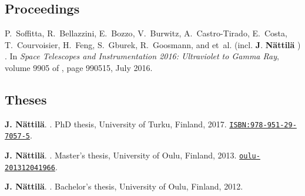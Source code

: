 \documentclass[10pt]{article}
\begin{document}
\vspace{-20pt}
\renewcommand\refname{\phantom{bla}}



\nocite{*}


\subsection*{\phantom{sub} Proceedings}
\vspace{-20pt}
\begin{thebibliography}{1}
\vspace{-5pt}

P.~{Soffitta}, R.~{Bellazzini}, E.~{Bozzo}, V.~{Burwitz}, A.~{Castro-Tirado},
  E.~{Costa}, T.~{Courvoisier}, H.~{Feng}, S.~{Gburek}, R.~{Goosmann}, and
  et~al. (incl. \textbf{J}. \textbf{{N{\"a}ttil{\"a}}} )
.
\newblock In {\em Space Telescopes and Instrumentation 2016: Ultraviolet to
  Gamma Ray}, volume 9905 of {\em \procspie}, page 990515, July 2016.


\end{thebibliography}

\subsection*{\phantom{sub} Theses}

\vspace{-20pt}
%
\begin{thebibliography}{3}
\vspace{-5pt}

\textbf{J. N\"attil\"a}.
.
\newblock PhD thesis, University of Turku, Finland, 2017. \href{http://urn.fi/URN:ISBN:978-951-29-7057-5}{\nolinkurl{ISBN:978-951-29-7057-5}}.

\textbf{J. N\"attil\"a}.
.
\newblock Master's thesis, University of Oulu, Finland, 2013. \href{http://urn.fi/URN:NBN:fi:oulu-201312041966}{\nolinkurl{oulu-201312041966}}.

\textbf{J. N\"attil\"a}.
.
\newblock Bachelor's thesis, University of Oulu, Finland, 2012.

\end{thebibliography}
\end{document}
